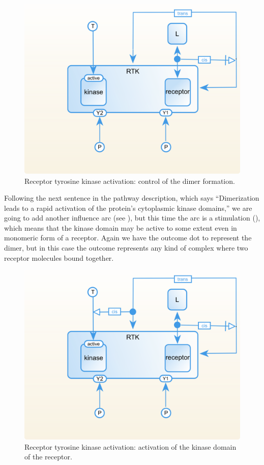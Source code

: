 \begin{figure}[H]
  \centering
  \vspace*{-0.75em}
  \includegraphics[scale=0.75]{examples/rtk-dimer-control.png}
   \caption{Receptor tyrosine kinase activation: control of the dimer formation.}
  \label{fig:rtk-dimer-control}
\end{figure}

Following the next sentence in the pathway description, which says ``Dimerization leads to a rapid activation of the protein's cytoplasmic kinase domains,'' we are going to add another influence arc (see ), but this time the arc is a stimulation (), which means that the kinase domain may be active to some extent even in monomeric form of a receptor. Again we have the outcome dot to represent the dimer, but in this case the outcome represents any kind of complex where two receptor molecules bound together.

\begin{figure}[H]
  \centering
  \vspace*{-0.75em}
  \includegraphics[scale=0.75]{examples/rtk-kinase-activation.png}
   \caption{Receptor tyrosine kinase activation: activation of the kinase domain of the receptor.}
  \label{fig:rtk-kinase-activation}
\end{figure}

